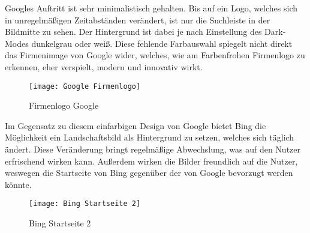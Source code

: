 Googles Auftritt ist sehr minimalistisch gehalten. Bis auf ein Logo, welches sich in unregelmäßigen Zeitabständen verändert,
ist nur die Suchleiste in der Bildmitte zu sehen. Der Hintergrund ist dabei je nach Einstellung des Dark-Modes dunkelgrau
oder weiß. Diese fehlende Farbauswahl spiegelt nicht direkt das Firmenimage von Google wider, welches, wie am Farbenfrohen
Firmenlogo zu erkennen, eher verspielt, modern und innovativ wirkt.
\begin{figure}[h]
    \centering
    \texttt{[image: Google Firmenlogo]}
    \caption{Firmenlogo Google\cite{.2020}}
\end{figure}

Im Gegensatz zu diesem einfarbigen Design von Google bietet Bing die Möglichkeit ein Landschaftsbild als Hintergrund zu
setzen, welches sich täglich ändert. Diese Veränderung bringt regelmäßige Abwechslung, was auf den Nutzer erfrischend wirken
kann. Außerdem wirken die Bilder freundlich auf die Nutzer, weswegen die Startseite von Bing gegenüber der von Google
bevorzugt werden könnte.
\begin{figure}[h]
    \centering
    \texttt{[image: Bing Startseite 2]}
    \caption{Bing Startseite 2}
\end{figure}

